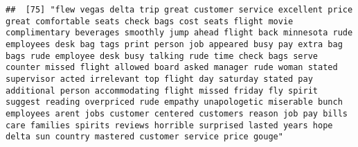 \documentclass[
]{article}
\begin{document}
\begin{verbatim}
##  [75] "flew vegas delta trip great customer service excellent price great comfortable seats check bags cost seats flight movie complimentary beverages smoothly jump ahead flight back minnesota rude employees desk bag tags print person job appeared busy pay extra bag bags rude employee desk busy talking rude time check bags serve counter missed flight allowed board asked manager rude woman stated supervisor acted irrelevant top flight day saturday stated pay additional person accommodating flight missed friday fly spirit suggest reading overpriced rude empathy unapologetic miserable bunch employees arent jobs customer centered customers reason job pay bills care families spirits reviews horrible surprised lasted years hope delta sun country mastered customer service price gouge"                                                                                                                                                                                                                                                                                                                                                                                                                                                                                                                                                                                                                                                                                                                                                                                                                                                                                                                                                                                  

\end{verbatim}
\end{document}
